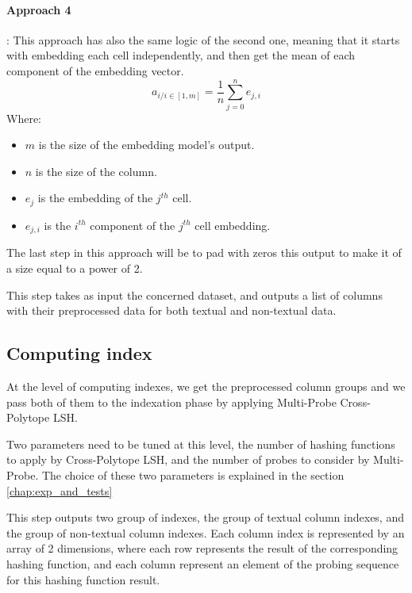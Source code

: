 \paragraph{Approach 4}: This approach has also the same logic of the second one,
meaning that it starts with embedding each cell independently, and then get the
mean of each component of the embedding vector.
\begin{equation}
    a_{i / i \in [1, m]} = \frac{1}{n} \sum_{j=0}^{n} e_{j, i}
\end{equation}
Where:
\begin{multicols}{2}
    \begin{itemize}
        \item $m$ is the size of the embedding model's output.
        \item $n$ is the size of the column.
        \item $e_j$ is the embedding of the $j^{th}$ cell.
        \item $e_{j, i}$ is the $i^{th}$ component of the $j^{th}$ cell
        embedding.
    \end{itemize}
\end{multicols}
The last step in this approach will be to pad with zeros this output to make it
of a size equal to a power of 2.


This step takes as input the concerned dataset, and outputs a list of columns
with their preprocessed data for both textual and non-textual data.

\subsection{Computing index}
At the level of computing indexes, we get the preprocessed column groups and we
pass both of them to the indexation phase by applying Multi-Probe Cross-Polytope
LSH.

Two parameters need to be tuned at this level, the number of hashing functions
to apply by Cross-Polytope LSH, and the number of probes to consider by
Multi-Probe. The choice of these two parameters is explained in the section
\ref{chap:exp_and_tests}

This step outputs two group of indexes, the group of textual column indexes, and
the group of non-textual column indexes. Each column index is represented by an
array of 2 dimensions, where each row represents the result of the corresponding
hashing function, and each column represent an element of the probing sequence
for this hashing function result.

